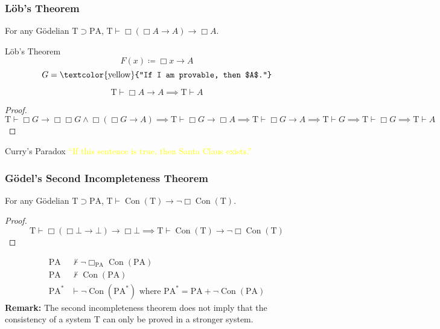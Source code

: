 \documentclass[UTF8,aspectratio=43,11pt,colorlinks,compress,openany]{beamer}%
\begin{document}
\begin{frame}\frametitle{L\"ob's Theorem}
\setlength\abovedisplayskip{0pt}
\setlength\belowdisplayskip{0pt}
	\begin{theorem}[L\"ob's Theorem]
		For any G\"odelian $\mathrm{T}\supset \mathrm{PA} $, $\mathrm{T}\vdash\Box (\Box A\to A)\to\Box A$.
	\end{theorem}
	\begin{block}{L\"ob's Theorem}
		\[F(x)\coloneqq \Box x\to A\]
		\[G=\text{\textcolor{yellow}{``If I am provable, then $A$.''}}\]
	\end{block}
	\begin{corollary}
		\[\mathrm{T}\vdash\Box A\to A\implies \mathrm{T}\vdash A\]
	\end{corollary}\vspace{-1ex}
	\begin{proof}
	$\mathrm{T}\vdash\Box G\to \Box \Box G\wedge\Box (\Box G\to A)\implies\mathrm{T}\vdash\Box G\to\Box A\implies \mathrm{T}\vdash\Box G\to A\implies\mathrm{T}\vdash G\implies\mathrm{T}\vdash\Box G\implies\mathrm{T}\vdash A$
	\end{proof}\vspace{-1ex}
	\begin{block}{Curry's Paradox}
		\centering \textcolor{yellow}{``If this sentence is true, then Santa Claus exists.''}
	\end{block}
\end{frame}

\begin{frame}\frametitle{G\"odel's Second Incompleteness Theorem}
\setlength\abovedisplayskip{0pt}
\setlength\belowdisplayskip{0pt}
	\begin{theorem}
		For any G\"odelian $\mathrm{T}\supset \mathrm{PA} $, $\mathrm{T}\vdash\operatorname{Con}(\mathrm{T})\to\neg\Box \operatorname{Con}(\mathrm{T})$.
	\end{theorem}
	\begin{proof}
		\[\mathrm{T}\vdash\Box (\Box \bot\to\bot)\to\Box \bot\implies\mathrm{T}\vdash\operatorname{Con}(\mathrm{T})\to\neg\Box \operatorname{Con}(\mathrm{T})\]
	\end{proof}
	\begin{align*}
		\mathrm{PA}&\nvdash\neg\Box_{\mathrm{PA}}\operatorname{Con}(\mathrm{PA})\\
		\mathrm{PA}&\nvdash\operatorname{Con}(\mathrm{PA})\\
		\mathrm{PA}^*&\vdash\neg\operatorname{Con}(\mathrm{PA}^*) \mbox{ where } \mathrm{PA}^*=\mathrm{PA}+\neg\operatorname{Con}(\mathrm{PA})
	\end{align*}
	\textbf{Remark:} The second incompleteness theorem does not imply that the consistency of a system $\mathrm{T}$ can only be proved in a stronger system.
\end{frame}
\end{document}
